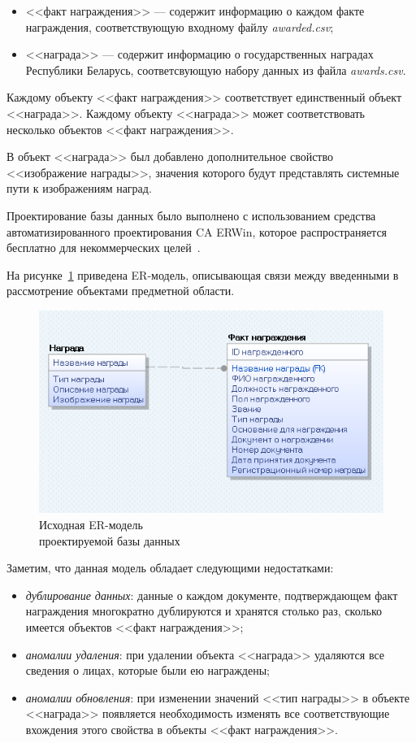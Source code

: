 \begin{itemize}
  \item <<факт награждения>> --- содержит информацию о каждом факте награждения,
    соответствующую входному файлу \textit{awarded.csv};
  \item <<награда>> --- содержит информацию о государственных наградах
    Республики Беларусь, соответсвующую набору данных из файла \textit{awards.csv}.
\end{itemize}

Каждому объекту <<факт награждения>> соответствует единственный
объект <<награда>>.
Каждому объекту <<награда>> может соответствовать несколько объектов
<<факт награждения>>.

В объект <<награда>> был добавлено дополнительное свойство
<<изображение награды>>, значения которого будут представлять
системные пути к изображениям наград.

Проектирование базы данных было выполнено с использованием средства 
автоматизированного проектирования CA ERWin, которое распространяется
бесплатно для некоммерческих целей~\cite{er_win_license}.

На рисунке~\ref{fig:er_naive} приведена ER-модель, описывающая связи между 
введенными в рассмотрение объектами предметной области.

\begin{figure}[h]
  \centering
  \includegraphics[width=130mm]{pic/er_naive.png}
  \caption{Исходная ER-модель \\ проектируемой базы данных}
  \label{fig:er_naive}
\end{figure}

Заметим, что данная модель обладает следующими недостатками:
\begin{itemize}
\item
  \textit{дублирование данных}: данные о каждом документе,
  подтверждающем факт награждения
  многократно дублируются и хранятся столько раз,
  сколько имеется объектов <<факт награждения>>;
\item
  \textit{аномалии удаления}: при удалении объекта <<награда>> удаляются
  все сведения о лицах, которые были ею награждены;
\item
  \textit{аномалии обновления}: при изменении значений <<тип награды>> в объекте
  <<награда>> появляется необходимость изменять все соответствующие вхождения этого свойства в
  объекты <<факт награждения>>.
\end{itemize}

